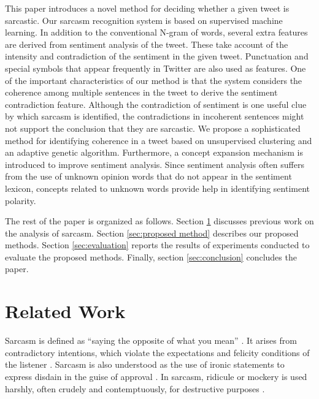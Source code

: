 \documentclass[english]{jnlp_1.4}
\begin{document}
This paper introduces a novel method for deciding whether a given tweet is sarcastic.
Our sarcasm recognition system is based on supervised machine learning.
In addition to the conventional N-gram of words, several extra features are derived from sentiment analysis of the tweet.
These take account of the intensity and contradiction of the sentiment in the given tweet.
Punctuation and special symbols that appear frequently in Twitter are also used as features.
One of the important characteristics of our method is that the system considers the coherence among multiple sentences in the tweet to derive the sentiment contradiction feature.
Although the contradiction of sentiment is one useful clue by which sarcasm is identified, the contradictions in incoherent sentences might not support the conclusion that they are sarcastic.
We propose a sophisticated method for identifying coherence in a tweet based on unsupervised clustering and an adaptive genetic algorithm.
Furthermore, a concept expansion mechanism is introduced to improve sentiment analysis.
Since sentiment analysis often suffers from the use of unknown opinion words that do not appear in the sentiment lexicon, concepts related to unknown words provide help in identifying sentiment polarity.

The rest of the paper is organized as follows.
Section \ref{sec:related work} discusses previous work on the analysis of sarcasm.
Section \ref{sec:proposed method} describes our proposed methods.
Section \ref{sec:evaluation} reports the results of experiments conducted to evaluate the proposed methods.
Finally, section \ref{sec:conclusion} concludes the paper.


\section{Related Work}
\label{sec:related work}

Sarcasm is defined as ``saying the opposite of what you mean'' \cite{Quintilien_1953}.
It arises from contradictory intentions, which violate the expectations and felicity conditions of the listener \cite{Stringfellow_1994,Grice_1975,Gibbs_2007}.
Sarcasm is also understood as the use of ironic statements to express disdain in the guise of approval \cite{Doerfler_2012}.
In sarcasm, ridicule or mockery is used harshly, often crudely and contemptuously, for destructive purposes \cite{Singh_2012}.
\end{document}
